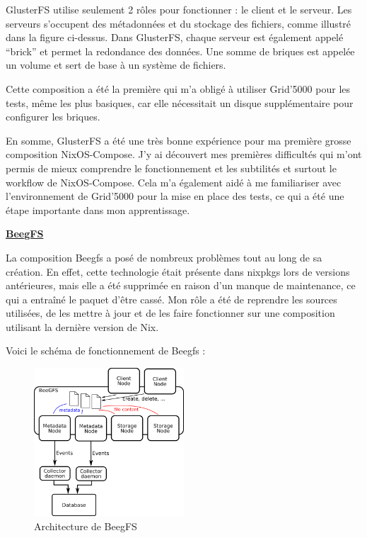 \documentclass[a4paper,french,12pt, titlepage]{article}
\begin{document}
GlusterFS utilise seulement 2 rôles pour fonctionner : le client et le
serveur. Les serveurs s'occupent des métadonnées et du stockage des
fichiers, comme illustré dans la figure ci-dessus. Dans GlusterFS,
chaque serveur est également appelé ``brick'' et permet la redondance
des données. Une somme de briques est appelée un volume et sert de base
à un système de fichiers.\newline

Cette composition a été la première qui m'a obligé à utiliser Grid'5000
pour les tests, même les plus basiques, car elle nécessitait un disque
supplémentaire pour configurer les briques.\newline

En somme, GlusterFS a été une très bonne expérience pour ma première
grosse composition NixOS-Compose. J'y ai découvert mes premières
difficultés qui m'ont permis de mieux comprendre le fonctionnement et
les subtilités et surtout le workflow de NixOS-Compose. Cela m'a
également aidé à me familiariser avec l'environnement de Grid'5000 pour
la mise en place des tests, ce qui a été une étape importante dans mon
apprentissage.\newline

\textbf{\href{https://www.beegfs.io/c/}{BeegFS} \cite{beegfs2014}}

La composition Beegfs a posé de nombreux problèmes tout au long de sa
création. En effet, cette technologie était présente dans nixpkgs lors
de versions antérieures, mais elle a été supprimée en raison d'un manque
de maintenance, ce qui a entraîné le paquet d'être cassé. Mon rôle a été
de reprendre les sources utilisées, de les mettre à jour et de les faire
fonctionner sur une composition utilisant la dernière version de
Nix.\newline

Voici le schéma de fonctionnement de Beegfs :

\begin{figure}[h]
\centering
\includegraphics[width=0.5\textwidth,height=0.5\textheight,keepaspectratio]{images/shema-beegfs.png}
\caption{Architecture de BeegFS}
\end{figure}
\end{document}
